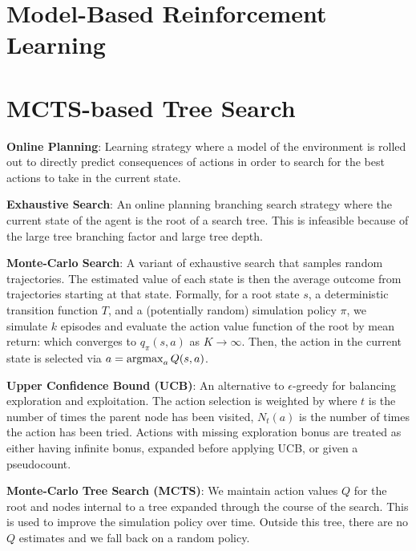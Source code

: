 \documentclass{article}
\begin{document}
\section{Model-Based Reinforcement Learning}

\section{MCTS-based Tree Search}
  
  \textbf{Online Planning}: Learning strategy where a model of the environment is rolled out to directly predict consequences of actions in order to search for the best actions to take in the current state.

  \textbf{Exhaustive Search}: An online planning branching search strategy where the current state of the agent is the root of a search tree. This is infeasible because of the large tree branching factor and large tree depth. 

  \textbf{Monte-Carlo Search}: A variant of exhaustive search that samples random trajectories. The estimated value of each state is then the average outcome from trajectories starting at that state. Formally, for a root state $s$, a deterministic transition function $T$, and a (potentially random) simulation policy $\pi$, we simulate $k$ episodes
  and evaluate the action value function of the root by mean return:
  which converges to $q_\pi(s,a)$ as $K\to\infty$. Then, the action in the current state is selected via $a=\operatorname*{argmax}_{a} Q(s,a)$. 

  \textbf{Upper Confidence Bound (UCB)}: An alternative to $\epsilon$-greedy for balancing exploration and exploitation. The action selection is weighted by
  where $t$ is the number of times the parent node has been visited, $N_t(a)$ is the number of times the action has been tried. Actions with missing exploration bonus are treated as either having infinite bonus, expanded before applying UCB, or given a pseudocount.

  \textbf{Monte-Carlo Tree Search (MCTS)}: We maintain action values $Q$ for the root and nodes internal to a tree expanded through the course of the search. This is used to improve the simulation policy over time. Outside this tree, there are no $Q$ estimates and we fall back on a random policy. 
\end{document}
